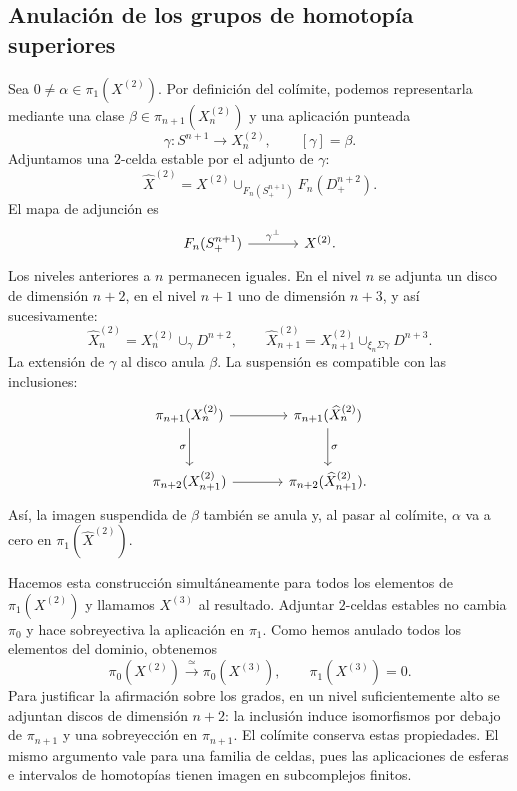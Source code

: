 \subsection{Anulación de los grupos de homotopía superiores}
Sea $0\ne\alpha\in\pi_1(X^{(2)})$. Por definición del colímite, podemos representarla mediante una clase $\beta\in\pi_{n+1}(X^{(2)}_n)$ y una aplicación punteada
\[
\gamma\colon S^{n+1}\longrightarrow X^{(2)}_n,
\qquad[\gamma]=\beta.
\]
Adjuntamos una $2$-celda estable por el adjunto de $\gamma$:
\[
\widehat X^{(2)}=X^{(2)}
\cup_{F_n(S^{n+1}_+)}F_n(D^{n+2}_+).
\]
El mapa de adjunción es
\[
\begin{tikzcd}[column sep=large]
F_n(S^{n+1}_+)\arrow[r,"\gamma^\perp"]&X^{(2)}.
\end{tikzcd}
\]
Los niveles anteriores a $n$ permanecen iguales. En el nivel $n$ se adjunta un disco de dimensión $n+2$, en el nivel $n+1$ uno de dimensión $n+3$, y así sucesivamente:
\[
\widehat X^{(2)}_n=X^{(2)}_n\cup_\gamma D^{n+2},
\qquad
\widehat X^{(2)}_{n+1}
=X^{(2)}_{n+1}\cup_{\xi_n\Sigma\gamma}D^{n+3}.
\]
La extensión de $\gamma$ al disco anula $\beta$. La suspensión es compatible con las inclusiones:
\[
\begin{tikzcd}[column sep=large,row sep=large]
\pi_{n+1}(X^{(2)}_n)\arrow[r]\arrow[d,"\sigma"']
&\pi_{n+1}(\widehat X^{(2)}_n)\arrow[d,"\sigma"]\\
\pi_{n+2}(X^{(2)}_{n+1})\arrow[r]
&\pi_{n+2}(\widehat X^{(2)}_{n+1}).
\end{tikzcd}
\]
Así, la imagen suspendida de $\beta$ también se anula y, al pasar al colímite, $\alpha$ va a cero en $\pi_1(\widehat X^{(2)})$.

Hacemos esta construcción simultáneamente para todos los elementos de $\pi_1(X^{(2)})$ y llamamos $X^{(3)}$ al resultado. Adjuntar $2$-celdas estables no cambia $\pi_0$ y hace sobreyectiva la aplicación en $\pi_1$. Como hemos anulado todos los elementos del dominio, obtenemos
\[
\pi_0(X^{(2)})\xrightarrow{\ \simeq\ }\pi_0(X^{(3)}),
\qquad\pi_1(X^{(3)})=0.
\]
Para justificar la afirmación sobre los grados, en un nivel suficientemente alto se adjuntan discos de dimensión $n+2$: la inclusión induce isomorfismos por debajo de $\pi_{n+1}$ y una sobreyección en $\pi_{n+1}$. El colímite conserva estas propiedades. El mismo argumento vale para una familia de celdas, pues las aplicaciones de esferas e intervalos de homotopías tienen imagen en subcomplejos finitos.

